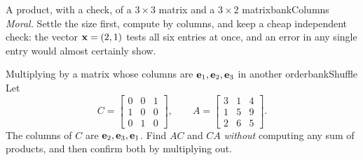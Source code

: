 \documentclass[11pt]{article}
\begin{document}
\begin{exmp}{A product, with a check, of a $3\times3$ matrix and a $3\times2$ matrix}{bankColumns}
\emph{Moral.} Settle the size first, compute by columns, and keep a cheap independent check: the vector $\mathbf{x}=(2,1)$ tests all six entries at once, and an error in any single entry would almost certainly show.
\end{exmp}

\begin{exmp}{Multiplying by a matrix whose columns are $\mathbf{e}_1,\mathbf{e}_2,\mathbf{e}_3$ in another order}{bankShuffle}
Let
\[
C=\begin{bmatrix}0&0&1\\1&0&0\\0&1&0\end{bmatrix},\qquad A=\begin{bmatrix}3&1&4\\1&5&9\\2&6&5\end{bmatrix}.
\]
The columns of $C$ are $\mathbf{e}_2,\mathbf{e}_3,\mathbf{e}_1$. Find $AC$ and $CA$ \emph{without} computing any sum of products, and then confirm both by multiplying out.


\end{exmp}
\end{document}
